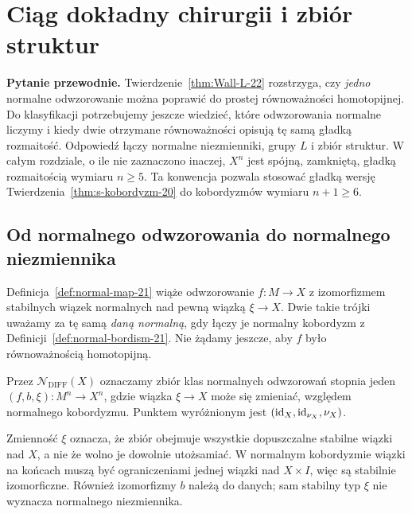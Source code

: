 \chapter{Ciąg dokładny chirurgii i zbiór struktur}
\label{ch:ciag-chirurgii}

\noindent\textbf{Pytanie przewodnie.}
Twierdzenie~\ref{thm:Wall-L-22} rozstrzyga, czy
\emph{jedno} normalne odwzorowanie można poprawić
do prostej równoważności homotopijnej.
Do klasyfikacji potrzebujemy jeszcze wiedzieć,
które odwzorowania normalne liczymy i kiedy
dwie otrzymane równoważności opisują tę samą
gładką rozmaitość. Odpowiedź łączy normalne
niezmienniki, grupy $L$ i zbiór struktur.
W całym rozdziale, o ile nie zaznaczono inaczej,
$X^n$ jest spójną, zamkniętą, gładką
rozmaitością wymiaru $n\geq5$.
Ta konwencja pozwala stosować gładką
wersję Twierdzenia~\ref{thm:s-kobordyzm-20}
do kobordyzmów wymiaru $n+1\geq6$.

\section{Od normalnego odwzorowania do normalnego niezmiennika}
\label{sec:normalne-niezmienniki-23}

Definicja~\ref{def:normal-map-21} wiąże
odwzorowanie $f:M\to X$ z izomorfizmem
stabilnych wiązek normalnych nad pewną
wiązką $\xi\to X$. Dwie takie trójki
uważamy za tę samą \emph{daną normalną},
gdy łączy je normalny kobordyzm z
Definicji~\ref{def:normal-bordism-21}.
Nie żądamy jeszcze, aby $f$ było
równoważnością homotopijną.

\begin{definicja}
\label{def:normal-invariants-23}
Przez $\mathcal N_{\mathrm{DIFF}}(X)$ oznaczamy
zbiór klas normalnych odwzorowań stopnia jeden
$(f,b,\xi):M^n\to X^n$, gdzie wiązka
$\xi\to X$ może się zmieniać, względem normalnego
kobordyzmu. Punktem wyróżnionym jest
$(\mathrm{id}_X,\mathrm{id}_{\nu_X},\nu_X)$.
\end{definicja}

Zmienność $\xi$ oznacza, że zbiór obejmuje wszystkie
dopuszczalne stabilne wiązki nad $X$, a nie że wolno
je dowolnie utożsamiać. W normalnym kobordyzmie wiązki
na końcach muszą być ograniczeniami jednej wiązki nad
$X\times I$, więc są stabilnie izomorficzne.
Również izomorfizmy $b$ należą do danych; sam stabilny
typ $\xi$ nie wyznacza normalnego niezmiennika.

